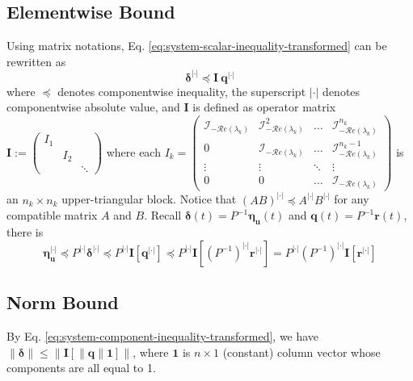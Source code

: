 \documentclass[accepted]{uai2023}
\newcommand{\vect}[1]{\mathbf{#1}}
\newcommand{\Err}{\eta}
\newcommand{\I}{\mathcal{I}}
\renewcommand{\Re}[1]{\mathcal{R}e\left(#1\right)}
\newcommand{\abs}{|\cdot|}
\begin{document}
\subsection{Elementwise Bound}
    Using matrix notations, Eq. \ref{eq:system-scalar-inequality-transformed} can be rewritten as
    \begin{equation} \label{eq:system-component-inequality-transformed}
        \pmb{\delta}^{\abs} \preceq \vect{I}\ \vect{q}^{\abs}
    \end{equation}
    where $\preceq$ denotes componentwise inequality, the superscript $\abs$ denotes componentwise absolute value, and $\vect{I}$ is defined as operator matrix $\vect{I} := \begin{pmatrix} I_1 \\ & I_2 \\ && \ddots \end{pmatrix}$ where each $I_k = \begin{pmatrix}
        \I_{-\Re{\lambda_k}} & \I_{-\Re{\lambda_k}}^2 & \dots &\I_{-\Re{\lambda_k}}^{n_k} \\[1ex]
        0 & \I_{-\Re{\lambda_k}} & \dots &\I_{-\Re{\lambda_k}}^{n_k-1} \\
        \vdots & \vdots & \ddots & \vdots \\
        0 & 0 & \dots & \I_{-\Re{\lambda_k}}
    \end{pmatrix}$ is an $n_k \times n_k$ upper-triangular block.
    Notice that $(AB)^{\abs} \preceq A^{\abs} B^{\abs}$ for any compatible matrix $A$ and $B$. Recall $\pmb{\delta}(t) = P^{-1}\pmb{\Err}_{\vect{u}}(t)$ and $\pmb{q}(t) = P^{-1} \vect{r}(t)$, there is
    \begin{equation}
        \pmb{\Err}_{\vect{u}}^{\abs} 
        \preceq P^{\abs}\pmb{\delta}^{\abs} 
        \preceq P^{\abs} \vect{I} \left[\vect{q}^{\abs} \right]
        \preceq P^{\abs} \vect{I} \left[(P^{-1})^{\abs} \vect{r}^{\abs}\right]
        = P^{\abs} (P^{-1})^{\abs}  \vect{I} \left[\vect{r}^{\abs}\right]
    \end{equation}
\subsection{Norm Bound}
    By Eq. \ref{eq:system-component-inequality-transformed}, we have $ \|\pmb{\delta}\| \leq \big\|\vect{I} [\|\vect{q}\| \vect{1}]\big\|$, where $\vect{1}$ is $n \times 1$ (constant) column vector whose components are all equal to 1.
\end{document}
